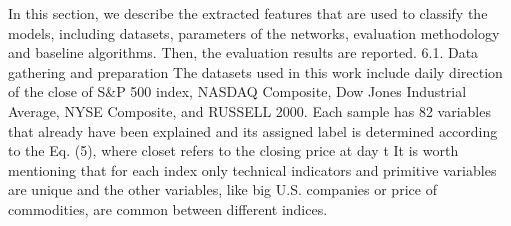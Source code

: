 In this section, we describe the extracted features that are used to classify the models, including datasets, parameters of the networks,
evaluation methodology and baseline algorithms. Then, the evaluation results are reported.
6.1. Data gathering and preparation
The datasets used in this work include daily direction of the
close of S&P 500 index, NASDAQ Composite, Dow Jones Industrial
Average, NYSE Composite, and RUSSELL 2000. Each sample has 82
variables that already have been explained and its assigned label
is determined according to the Eq. (5), where closet refers to the
closing price at day t It is worth mentioning that for each index
only technical indicators and primitive variables are unique and
the other variables, like big U.S. companies or price of commodities, are common between different indices.